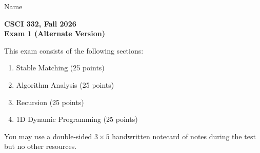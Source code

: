 \documentclass[11pt]{article}
\begin{document}
\noindent Name \underline{\hspace{12cm}}\\
\begin{center}
\Large\textbf{CSCI 332, Fall 2026}\\
\LARGE\textbf{Exam 1 (Alternate Version)}
\end{center}
\noindent This exam consists of the following sections:
\begin{enumerate}
\item Stable Matching (25 points)
\item Algorithm Analysis (25 points)
\item Recursion (25 points)
\item 1D Dynamic Programming (25 points)
\end{enumerate}
You may use a double-sided $3\times5$ handwritten notecard of notes during the test but no other resources.
\end{document}
